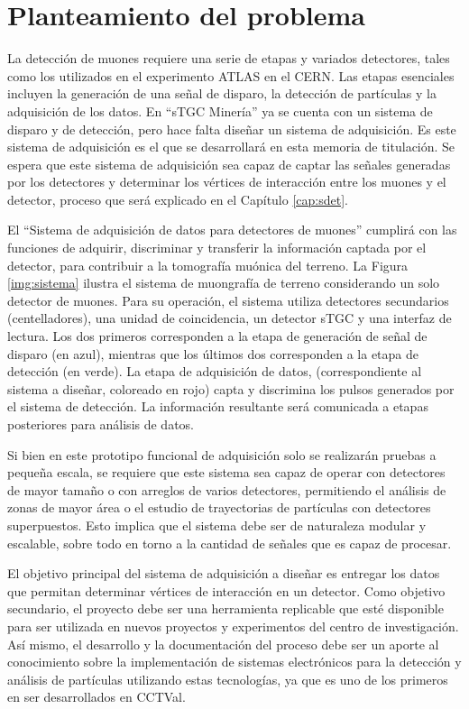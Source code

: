 \section{Planteamiento del problema}
\label{sec:planteamiento}
	La detección de muones requiere una serie de etapas y variados detectores,  tales como los utilizados en el experimento ATLAS en el CERN. Las etapas esenciales incluyen la generación de una señal de disparo\cite{Oyanadel2020SistemaSTGC}, la detección de partículas y la adquisición de los datos. En ``sTGC Minería'' ya se cuenta con un sistema de disparo y de detección, pero hace falta diseñar un sistema de adquisición. Es este sistema de adquisición es el que se desarrollará en esta memoria de titulación. Se espera que este sistema de adquisición sea capaz de captar las señales generadas por los detectores y determinar los vértices de interacción entre los muones y el detector, proceso que será explicado en el Capítulo \ref{cap:sdet}. 
	
	El ``Sistema de adquisición de datos para detectores de muones'' cumplirá con las funciones de adquirir, discriminar y transferir la información captada por el detector, para contribuir a la tomografía muónica del terreno. La Figura \ref{img:sistema} ilustra el sistema de muongrafía de terreno considerando un solo detector de muones. Para su operación, el sistema utiliza detectores secundarios (centelladores), una unidad de coincidencia, un detector sTGC y una interfaz de lectura. Los dos primeros corresponden a la etapa de generación de señal de disparo (en azul), mientras que los últimos dos corresponden a la etapa de detección (en verde). La etapa de adquisición de datos, (correspondiente al sistema  a diseñar, coloreado en rojo) capta y discrimina los pulsos generados por el sistema de detección. La información resultante será comunicada a etapas posteriores para análisis de datos.
	
	Si bien en este prototipo funcional de adquisición solo se realizarán pruebas a pequeña escala, se requiere que este sistema sea capaz de operar con detectores de mayor tamaño o con arreglos de varios detectores, permitiendo el análisis de zonas de mayor área o el estudio de trayectorias de partículas con detectores superpuestos. Esto implica que el sistema debe ser de naturaleza modular y escalable, sobre todo en torno a la cantidad de señales que es capaz de procesar. 
	
	El objetivo principal del sistema de adquisición a diseñar es entregar los datos que permitan determinar vértices de interacción en un detector. Como objetivo secundario, el proyecto debe ser una herramienta replicable que esté disponible para ser utilizada en nuevos proyectos y experimentos del centro de investigación. Así mismo, el desarrollo y la documentación del proceso debe ser un aporte al conocimiento sobre la implementación de sistemas electrónicos para la detección y análisis de partículas utilizando estas tecnologías, ya que es uno de los primeros en ser desarrollados en CCTVal. 
	
